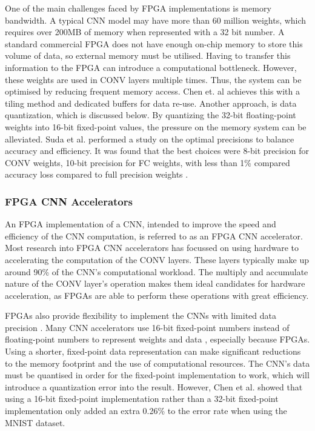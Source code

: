 \documentclass[12pt]{article}
\begin{document}
One of the main challenges faced by FPGA implementations is memory bandwidth. A typical CNN model may have more than 60 million weights, which requires over 200MB of memory when represented with a 32 bit number. A standard commercial FPGA does not have enough on-chip memory to store this volume of data, so external memory must be utilised. Having to transfer this information to the FPGA can introduce a computational bottleneck. However, these weights are used in CONV layers multiple times. Thus, the system can be optimised by reducing frequent memory access. Chen et. al achieves this with a tiling method and dedicated buffers for data re-use. Another approach, is data quantization, which is discussed below. By quantizing the 32-bit floating-point weights into 16-bit fixed-point values, the pressure on the memory system can be alleviated. Suda et al. performed a study on the optimal precisions to balance accuracy and efficiency. It was found that the best choices were 8-bit precision for CONV weights, 10-bit precision for FC weights, with less than 1\% compared accuracy loss compared to full precision weights \cite{SudaFpgaAccelerator}.

\subsubsection{FPGA CNN Accelerators}
\label{sec:Background-FpgaCnnImpl-Accel}


An FPGA implementation of a CNN, intended to improve the speed and efficiency of the CNN computation, is referred to as an FPGA CNN accelerator. Most research into FPGA CNN accelerators has focussed on using hardware to accelerating the computation of the CONV layers. These layers typically make up around 90\% of the CNN's computational workload. The multiply and accumulate nature of the CONV layer's operation makes them ideal candidates for hardware acceleration, as FPGAs are able to perform these operations with great efficiency. 

FPGAs also provide flexibility to implement the CNNs with limited data precision \cite{SudaFpgaAccelerator}. Many CNN accelerators use 16-bit fixed-point numbers instead of floating-point numbers to represent weights and data \cite{ZhangFpgaAccelerator}\cite{ChenFpgaAccelerator}\cite{FarabetFpgaAccelerator}, especially because FPGAs. Using a shorter, fixed-point data representation can make significant reductions to the memory footprint and the use of computational resources. The CNN's data must be quantised in order for the fixed-point implementation to work, which will introduce a quantization error into the result. However, Chen et al. showed that using a 16-bit fixed-point implementation rather than a 32-bit fixed-point implementation only added an extra 0.26\% to the error rate when using the MNIST dataset.
\end{document}
